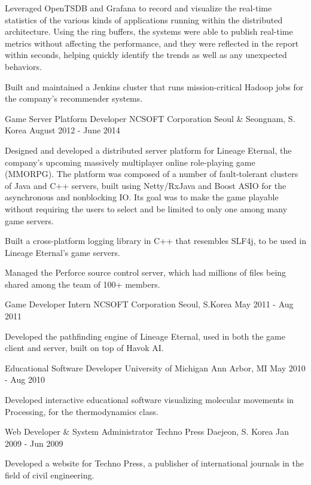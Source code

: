 \documentclass[12pt, a4paper]{awesome-cv}
\begin{document}
\begin{cventries}
{\begin{cvitems}
				\item Leveraged OpenTSDB and Grafana to record and visualize the real-time statistics of the various kinds of applications running within the distributed architecture. Using the ring buffers, the systems were able to publish real-time metrics without affecting the performance, and they were reflected in the report within seconds, helping quickly identify the trends as well as any unexpected behaviors.
				\item Built and maintained a Jenkins cluster that runs mission-critical Hadoop jobs for the company's recommender systems.
			\end{cvitems}
		}
		\cventry
		{Game Server Platform Developer}
		{NCSOFT Corporation}
		{Seoul \& Seongnam, S. Korea}
		{August 2012 - June 2014}
		{
			\begin{cvitems}
				\item Designed and developed a distributed server platform for Lineage Eternal, the company's upcoming massively multiplayer online role-playing game (MMORPG).
				The platform was composed of a number of fault-tolerant clusters of Java and C++ servers, built using Netty/RxJava and Boost ASIO for the asynchronous and nonblocking IO.
				Its goal was to make the game playable without requiring the users to select and be limited to only one among many game servers.
				\item Built a cross-platform logging library in C++ that resembles SLF4j, to be used in Lineage Eternal's game servers.
				\item Managed the Perforce source control server, which had millions of files being shared among the team of 100+ members.
			\end{cvitems}
		}
		\cventry
		{Game Developer Intern}
		{NCSOFT Corporation}
		{Seoul, S.Korea}
		{May 2011 - Aug 2011}
		{
			\begin{cvitems}
				\item Developed the pathfinding engine of Lineage Eternal, used in both the game client and server, built on top of Havok AI.
			\end{cvitems} 
		}
		\cventry
		{Educational Software Developer}
		{University of Michigan}
		{Ann Arbor, MI}
		{May 2010 - Aug 2010}
		{
			\begin{cvitems}
				\item Developed interactive educational software visualizing molecular movements in Processing, for the thermodynamics class.
			\end{cvitems} 
		}
		\cventry
		{Web Developer \& System Administrator}
		{Techno Press}
		{Daejeon, S. Korea}
		{Jan 2009 - Jun 2009}
		{
			\begin{cvitems}
				\item Developed a website for Techno Press, a publisher of international journals in the field of civil engineering.
			\end{cvitems} 
		}
	\end{cventries}
	
\end{document}
